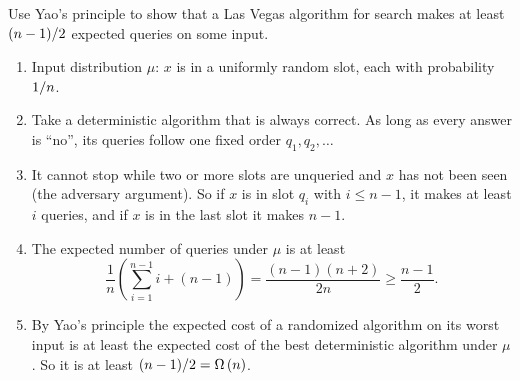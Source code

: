 \begin{exercisebox}
\begin{pproblem}\label{pp:yao-lv}
    Use Yao's principle to show that a Las Vegas algorithm for search makes at least
    $(n-1)/2$ expected queries on some input.
\end{pproblem}
\tcblower
\begin{wsolution}
    \leavevmode
    \begin{enumerate}
        \item Input distribution $\mu$: $x$ is in a uniformly random slot, each with probability
              $1/n$.
        \item Take a deterministic algorithm that is always correct. As long as every answer is
              ``no'', its queries follow one fixed order $q_1, q_2, \dots$
        \item It cannot stop while two or more slots are unqueried and $x$ has not been seen (the
              adversary argument). So if $x$ is in slot $q_i$ with $i \leq n - 1$, it makes at least
              $i$ queries, and if $x$ is in the last slot it makes $n - 1$.
        \item The expected number of queries under $\mu$ is at least
              \[\frac{1}{n} \left(\sum_{i=1}^{n-1} i + (n-1)\right) = \frac{(n-1)(n+2)}{2n} \geq \frac{n-1}{2}.\]
        \item By Yao's principle the expected cost of a randomized algorithm on its worst input is
              at least the expected cost of the best deterministic algorithm under $\mu$. So it is
              at least $(n-1)/2 = \Omega\left(n\right)$. \qedhere
    \end{enumerate}
\end{wsolution}
\end{exercisebox}

